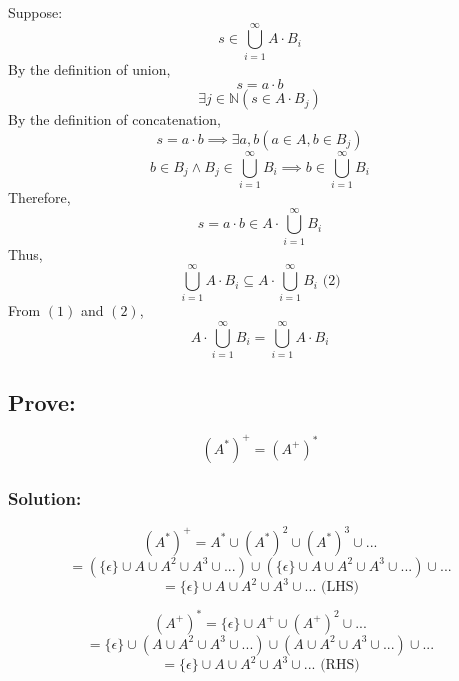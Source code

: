 \documentclass[12pt]{article}
\begin{document}
Suppose:
\[s\in \bigcup\limits_{i=1}^{\infty}A\cdot B_i\]
By the definition of union,
\[s = a \cdot b\]
\[\exists j \in \mathbb{N}(s \in A\cdot B_j)\]
By the definition of concatenation,
\[s = a \cdot b \implies \exists a, b (a \in A, b\in B_j )\]
\[b\in B_j \land B_j \in \bigcup\limits_{i=1}^{\infty}B_i \implies b \in \bigcup\limits_{i=1}^{\infty}B_i\]
Therefore, 
\[s = a\cdot b \in A \cdot \bigcup\limits_{i=1}^{\infty}B_i\]
Thus,
\[
 \bigcup\limits_{i=1}^{\infty}A\cdot B_i\subseteq A\cdot\bigcup\limits_{i=1}^{\infty} B_i \text{      (2)}
\]
From \((1)\) and \((2)\),
\[
A\cdot\bigcup\limits_{i=1}^{\infty} B_i=\bigcup\limits_{i=1}^{\infty}A\cdot B_i
\]

\subsection*{Prove:} 
\[
(A^*)^+=(A^+)^*
\]
\subsubsection*{Solution:}
\[(A^*)^+ = A^* \cup (A^*)^2 \cup (A^*)^3 \cup ... \]
\[= (\{\epsilon\} \cup A \cup A^2 \cup A^3 \cup ...) \cup (\{\epsilon\} \cup A \cup A^2 \cup A^3 \cup ...) \cup ...\]
\[= \{\epsilon\} \cup A \cup A^2 \cup A^3 \cup ...  \text{   (LHS)}\] 

\[(A^+)^* = \{\epsilon\} \cup A^+ \cup (A^+)^2 \cup ...\]
\[= \{\epsilon\} \cup (A \cup A^2 \cup A^3 \cup ...)\cup (A \cup A^2 \cup A^3 \cup ...)\cup ...\]
\[= \{\epsilon\} \cup A \cup A^2 \cup A^3 \cup ...  \text{   (RHS)}\] 
\end{document}
